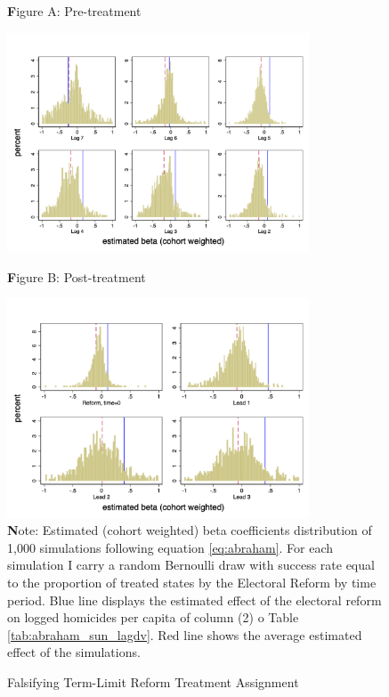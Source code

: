 \documentclass[12pt]{amsart}
\numberwithin{equation}{section}
\theoremstyle{definition}
\theoremstyle{definition}
\theoremstyle{definition}
\begin{document}
\begin{appendix}
  



\begin{figure}[h]  
\centering
\caption{Falsifying Term-Limit Reform Treatment Assignment} 
\label{fig:falsification}

\begin{center} 
	{\textbf Figure A: Pre-treatment}
\end{center} 
\includegraphics[width=0.8\textwidth]{Figures/falsification_pre2.png}
\begin{center}
	{\textbf Figure B: Post-treatment}
\end{center}
\includegraphics[width=0.8\textwidth]{Figures/falsification_post.png}
       \captionsetup{justification=centering}
       \\  
  {\textbf Note: Estimated (cohort weighted) beta coefficients distribution of 1,000 simulations following equation \ref{eq:abraham}. For each simulation I carry a random Bernoulli draw with success rate equal to the proportion of treated states by the Electoral Reform by time period. Blue line displays the estimated effect of the electoral reform on logged homicides per capita of column (2) o Table \ref{tab:abraham_sun_lagdv}. Red line shows the average estimated effect of the simulations.}     
 

\end{figure}
\end{appendix}
\end{document}
